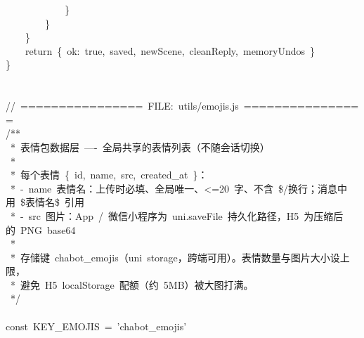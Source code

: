 \documentclass[a4paper,10pt]{article}
\begin{document}
{~~~~~~~~~~~~\}\\
~~~~~~~~\}\\
~~~~\}\\
~~~~return~\{~ok:~true,~saved,~newScene,~cleanReply,~memoryUndos~\}\\
\}\\
\mbox{}\\
\mbox{}\\
//~================~FILE:~utils/emojis.js~================\\
/**\\
~*~表情包数据层~----~全局共享的表情列表（不随会话切换）\\
~*\\
~*~每个表情~\{~id,~name,~src,~created\_at~\}：\\
~*~-~name~表情名：上传时必填、全局唯一、<=20~字、不含~\$/换行；消息中用~\$表情名\$~引用\\
~*~-~src~图片：App~/~微信小程序为~uni.saveFile~持久化路径，H5~为压缩后的~PNG~base64\\
~*\\
~*~存储键~chabot\_emojis（uni~storage，跨端可用）。表情数量与图片大小设上限，\\
~*~避免~H5~localStorage~配额（约~5MB）被大图打满。\\
~*/\\
\mbox{}\\
const~KEY\_EMOJIS~=~'chabot\_emojis'
}

\newpage
\end{document}
